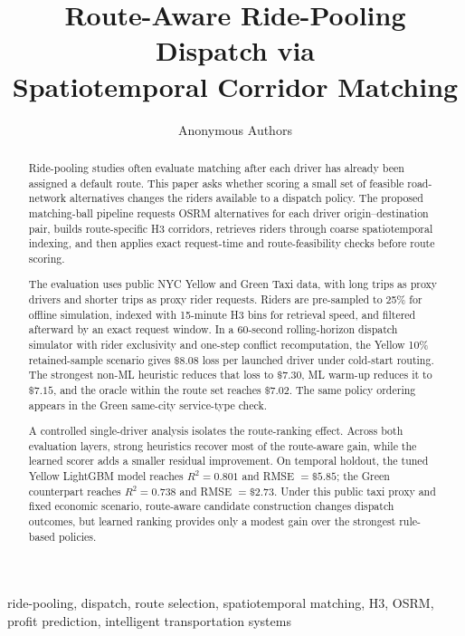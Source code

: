 \documentclass[journal]{IEEEtran}
\title{Route-Aware Ride-Pooling Dispatch via\\Spatiotemporal Corridor Matching}
\author{Anonymous Authors}
\begin{document}
\maketitle
\vspace{-1.0em}

\begin{abstract}
Ride-pooling studies often evaluate matching after each driver has already been assigned a default route. This paper asks whether scoring a small set of feasible road-network alternatives changes the riders available to a dispatch policy. The proposed matching-ball pipeline requests OSRM alternatives for each driver origin--destination pair, builds route-specific H3 corridors, retrieves riders through coarse spatiotemporal indexing, and then applies exact request-time and route-feasibility checks before route scoring.

The evaluation uses public NYC Yellow and Green Taxi data, with long trips as proxy drivers and shorter trips as proxy rider requests. Riders are pre-sampled to 25\% for offline simulation, indexed with 15-minute H3 bins for retrieval speed, and filtered afterward by an exact request window. In a 60-second rolling-horizon dispatch simulator with rider exclusivity and one-step conflict recomputation, the Yellow 10\% retained-sample scenario gives \(\$8.08\) loss per launched driver under cold-start routing. The strongest non-ML heuristic reduces that loss to \(\$7.30\), ML warm-up reduces it to \(\$7.15\), and the oracle within the route set reaches \(\$7.02\). The same policy ordering appears in the Green same-city service-type check.

A controlled single-driver analysis isolates the route-ranking effect. Across both evaluation layers, strong heuristics recover most of the route-aware gain, while the learned scorer adds a smaller residual improvement. On temporal holdout, the tuned Yellow LightGBM model reaches \(R^2=0.801\) and RMSE \(=\$5.85\); the Green counterpart reaches \(R^2=0.738\) and RMSE \(=\$2.73\). Under this public taxi proxy and fixed economic scenario, route-aware candidate construction changes dispatch outcomes, but learned ranking provides only a modest gain over the strongest rule-based policies.
\end{abstract}

\begin{IEEEkeywords}
ride-pooling, dispatch, route selection, spatiotemporal matching, H3, OSRM, profit prediction, intelligent transportation systems
\end{IEEEkeywords}
\end{document}
